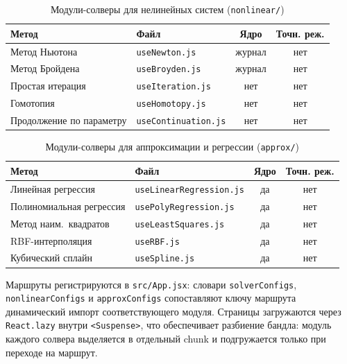 \documentclass[12pt, oneside]{book}
\begin{document}
\begin{table}[H]
\centering
\scriptsize
\renewcommand{\arraystretch}{1.15}
\begin{tabular}{|p{3.5cm}|p{3.0cm}|c|c|}
\hline
\rowcolor{thbg} \textbf{Метод} & \textbf{Файл} & \textbf{Ядро} & \textbf{Точн. реж.} \\
\hline
Метод Ньютона & \texttt{useNewton.js} & журнал & нет \\ \hline
Метод Бройдена & \texttt{useBroyden.js} & журнал & нет \\ \hline
Простая итерация & \texttt{useIteration.js} & нет & нет \\ \hline
Гомотопия & \texttt{useHomotopy.js} & нет & нет \\ \hline
Продолжение по параметру & \texttt{useContinuation.js} & нет & нет \\ \hline
\end{tabular}
\caption{Модули-солверы для нелинейных систем (\texttt{nonlinear/})}
\label{tab:solver_inventory_nonlinear}
\end{table}

\begin{table}[H]
\centering
\scriptsize
\renewcommand{\arraystretch}{1.15}
\begin{tabular}{|p{3.5cm}|p{3.0cm}|c|c|}
\hline
\rowcolor{thbg} \textbf{Метод} & \textbf{Файл} & \textbf{Ядро} & \textbf{Точн. реж.} \\
\hline
Линейная регрессия & \texttt{useLinearRegression.js} & да & нет \\ \hline
Полиномиальная регрессия & \texttt{usePolyRegression.js} & да & нет \\ \hline
Метод наим.\ квадратов & \texttt{useLeastSquares.js} & да & нет \\ \hline
RBF-интерполяция & \texttt{useRBF.js} & да & нет \\ \hline
Кубический сплайн & \texttt{useSpline.js} & да & нет \\ \hline
\end{tabular}
\caption{Модули-солверы для аппроксимации и регрессии (\texttt{approx/})}
\label{tab:solver_inventory_approx}
\end{table}

    \quad Маршруты регистрируются в \texttt{src/App.jsx}: словари \texttt{solverConfigs}, \texttt{nonlinear\-Configs} и \texttt{approxConfigs} сопоставляют ключу маршрута динамический импорт соответствующего модуля. Страницы загружаются через\\ \texttt{React.lazy} внутри \texttt{<Suspense>}, что обеспечивает разбиение бандла: модуль каждого солвера выделяется в отдельный chunk и подгружается только при переходе на маршрут.
\end{document}

